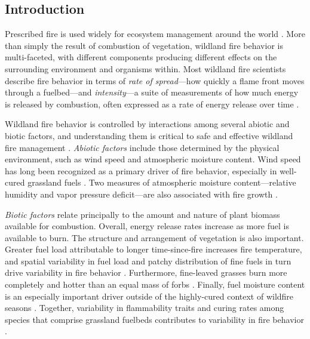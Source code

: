 \documentclass[referee, 
		     sn-basic]{sn-jnl}
\begin{document}

\maketitle
\begin{linenumbers}

\hypertarget{introduction}{%
\section{Introduction}\label{introduction}}

Prescribed fire is used widely for ecosystem management around the world \citep{weir2022}. 
More than simply the result of combustion of vegetation, wildland fire behavior is multi-faceted, with different components producing different effects on the surrounding environment and organisms within. 
Most wildland fire scientists describe fire behavior in terms of \emph{rate of spread}---how quickly a flame front moves through a fuelbed---and \emph{intensity}---a suite of measurements of how much energy is released by combustion, often expressed as a rate of energy release over time \citep{mcgranahan2021a}.

Wildland fire behavior is controlled by interactions among several
abiotic and biotic factors, and understanding them is critical to safe
and effective wildland fire management \citep{benson2009}. \emph{Abiotic
factors} include those determined by the physical environment, such as
wind speed and atmospheric moisture content. Wind speed has long been
recognized as a primary driver of fire behavior, especially in
well-cured grassland fuels
\citep{whittaker1961, cheney1995, kidnie2015}. Two measures of
atmospheric moisture content---relative humidity and vapor pressure
deficit---are also associated with fire growth
\citep{evett2008, reid2010, sedano2014}.

\emph{Biotic factors} relate principally to the amount and nature of
plant biomass available for combustion. Overall, energy release rates
increase as more fuel is available to burn. The structure and
arrangement of vegetation is also important. Greater fuel load
attributable to longer time-since-fire increases fire temperature, and
spatial variability in fuel load and patchy distribution of fine fuels
in turn drive variability in fire behavior
\citep{patten1984, gibson1990, gomes2020}. Furthermore, fine-leaved
grasses burn more completely and hotter than an equal mass of forbs
\citep{wragg2018}. Finally, fuel moisture content is an especially
important driver outside of the highly-cured context of wildfire seasons
\citep{sparling1966, kidnie2015}. Together, variability in flammability
traits and curing rates among species that comprise grassland fuelbeds
contributes to variability in fire behavior
\citep{cruz2015, kidnie2015, mcgranahan2016, cardoso2018}.


\end{linenumbers}
\end{document}
